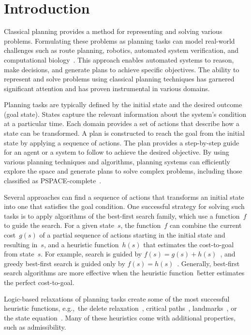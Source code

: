 \chapter{Introduction}
\label{chapter:introduction}

Classical planning provides a method for representing and solving various problems. Formulating these problems as planning tasks can model real-world challenges such as route planning, robotics, automated system verification, and computational biology~\cite{edelkamp2012heuristic}. This approach enables automated systems to reason, make decisions, and generate plans to achieve specific objectives. The ability to represent and solve problems using classical planning techniques has garnered significant attention and has proven instrumental in various domains.

Planning tasks are typically defined by the initial state and the desired outcome (goal state). States capture the relevant information about the system's condition at a particular time. Each domain provides a set of actions that describe how a state can be transformed. A plan is constructed to reach the goal from the initial state by applying a sequence of actions. The plan provides a step-by-step guide for an agent or a system to follow to achieve the desired objective. By using various planning techniques and algorithms, planning systems can efficiently explore the space and generate plans to solve complex problems, including those classified as PSPACE-complete~\cite{bylander1994computational}.

Several approaches can find a sequence of actions that transforms an initial state into one that satisfies the goal condition. One successful strategy for solving such tasks is to apply algorithms of the best-first search family, which use a function~$f$ to guide the search. For a given state~$s$, the function~$f$ can combine the current cost~$g(s)$ of a partial sequence of actions starting in the initial state and resulting in~$s$, and a heuristic function~$h(s)$ that estimates the cost-to-goal from state~$s$. For example, \astar search is guided by $f(s)=g(s)+h(s)$~\cite{hart1968formal}, and greedy best-first search is guided only by $f(s)=h(s)$~\cite{doran1966experiments}. Generally, best-first search algorithms are more effective when the heuristic function~\h better estimates the perfect cost-to-goal.

Logic-based relaxations of planning tasks create some of the most successful heuristic functions, e.g.,~the delete relaxation~\cite{hoffmann2001ff}, critical paths~\cite{haslum2004admissible}, landmarks~\cite{hoffmann2004ordered,karpas2009cost}, or the state equation~\cite{bonet2013admissible}. Many of these heuristics come with additional properties, such as admissibility.

